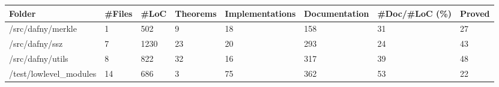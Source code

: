 \documentclass[a4paper, 12pt]{article}
\begin{document}
\vspace{2em}
\begin{tabular}{llllllll}
\toprule
                 Folder & \#Files &  \#LoC & Theorems & Implementations & Documentation & \#Doc/\#LoC (\%) & Proved \\
\midrule
      /src/dafny/merkle &      1 &   502 &        9 &              18 &           158 &            31 &     27 \\
         /src/dafny/ssz &      7 &  1230 &       23 &              20 &           293 &            24 &     43 \\
       /src/dafny/utils &      8 &   822 &       32 &              16 &           317 &            39 &     48 \\
 /test/lowlevel\_modules &     14 &   686 &        3 &              75 &           362 &            53 &     22 \\
\bottomrule
\end{tabular}
\end{document}
